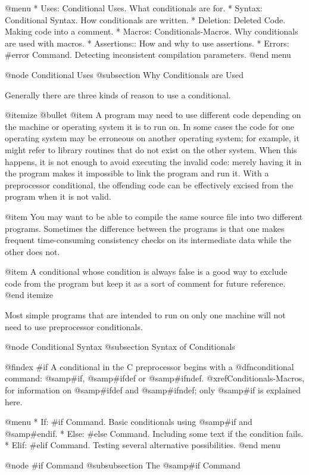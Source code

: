 {{@menu
* Uses: Conditional Uses.       What conditionals are for.
* Syntax: Conditional Syntax.   How conditionals are written.
* Deletion: Deleted Code.       Making code into a comment.
* Macros: Conditionals-Macros.  Why conditionals are used with macros.
* Assertions::		        How and why to use assertions.
* Errors: #error Command.       Detecting inconsistent compilation parameters.
@end menu

@node Conditional Uses
@subsection Why Conditionals are Used

Generally there are three kinds of reason to use a conditional.

@itemize @bullet
@item
A program may need to use different code depending on the machine or
operating system it is to run on.  In some cases the code for one
operating system may be erroneous on another operating system; for
example, it might refer to library routines that do not exist on the
other system.  When this happens, it is not enough to avoid executing
the invalid code: merely having it in the program makes it impossible
to link the program and run it.  With a preprocessor conditional, the
offending code can be effectively excised from the program when it is
not valid.

@item
You may want to be able to compile the same source file into two
different programs.  Sometimes the difference between the programs is
that one makes frequent time-consuming consistency checks on its
intermediate data while the other does not.

@item
A conditional whose condition is always false is a good way to exclude
code from the program but keep it as a sort of comment for future
reference.
@end itemize

Most simple programs that are intended to run on only one machine will
not need to use preprocessor conditionals.

@node Conditional Syntax
@subsection Syntax of Conditionals

@findex #if
A conditional in the C preprocessor begins with a @dfn{conditional
command}: @samp{#if}, @samp{#ifdef} or @samp{#ifndef}.
@xref{Conditionals-Macros}, for information on @samp{#ifdef} and
@samp{#ifndef}; only @samp{#if} is explained here.

@menu
* If: #if Command.     Basic conditionals using @samp{#if} and @samp{#endif}.
* Else: #else Command. Including some text if the condition fails.
* Elif: #elif Command. Testing several alternative possibilities.
@end menu

@node #if Command
@subsubsection The @samp{#if} Command

}}
